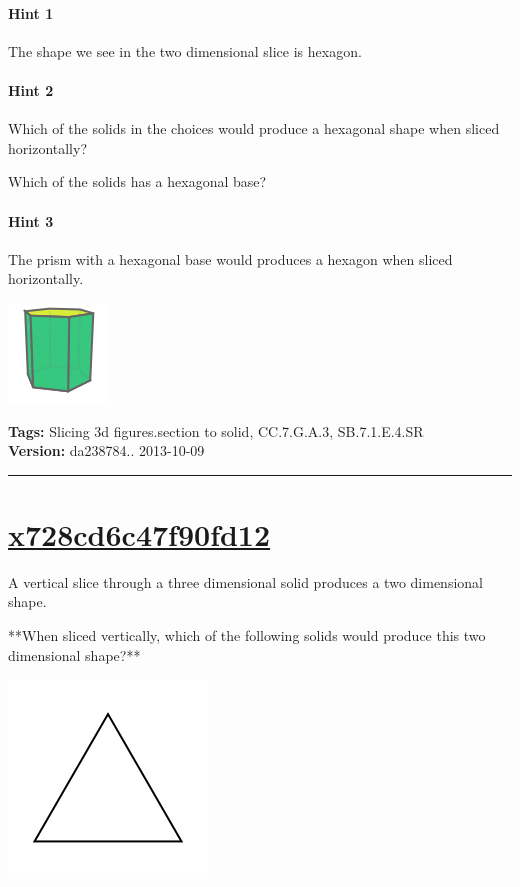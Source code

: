 \documentclass[twocolumn,10pt]{article}
\def\shrinkfactor{0.4}
\begin{document}
 

\paragraph{Hint 1}The shape we see in the two dimensional slice is hexagon.

\paragraph{Hint 2}Which of the solids in the choices would produce a hexagonal shape when sliced horizontally? 

Which of the solids has a hexagonal base?

\paragraph{Hint 3}The prism with a hexagonal base would produces a hexagon when sliced horizontally.


\includegraphics[scale=\shrinkfactor]{figures/994232bee673b9d41efe1aa168ac2544d5531e55.png}



\medskip
\noindent
\textbf{Tags:} {\footnotesize Slicing 3d figures.section to solid, CC.7.G.A.3, SB.7.1.E.4.SR}\\
\textbf{Version:} da238784.. 2013-10-09
\smallskip\hrule





\section{\href{https://www.khanacademy.org/devadmin/content/items/x728cd6c47f90fd12}{x728cd6c47f90fd12}}

\noindent
A vertical slice through a three dimensional solid produces a two dimensional shape.

**When sliced vertically, which of the following solids would produce this two dimensional shape?**   

\includegraphics[scale=\shrinkfactor]{figures/820f1a9b52329001eaf7845a5d6661adb18f27b8.png} 
\end{document}
